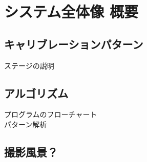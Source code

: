 \chapter{システム全体像 概要}
\label{chap:}

\section{キャリブレーションパターン}
ステージの説明

\section{アルゴリズム}
プログラムのフローチャート \\
パターン解析

\section{撮影風景？}